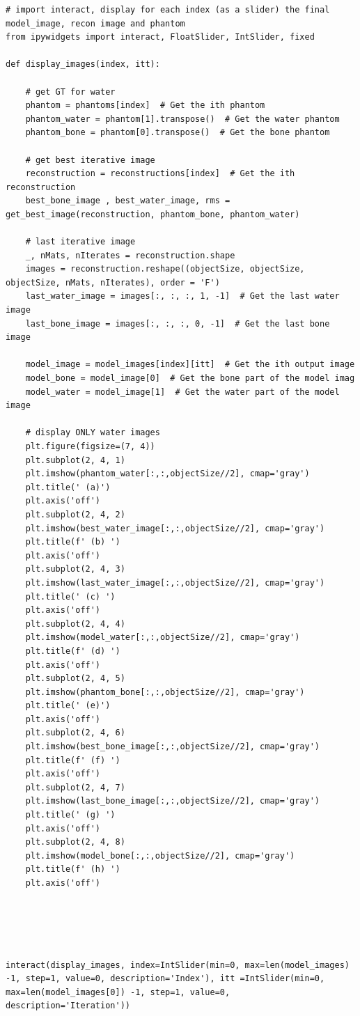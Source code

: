 \begin{verbatim}
# import interact, display for each index (as a slider) the final model_image, recon image and phantom
from ipywidgets import interact, FloatSlider, IntSlider, fixed

def display_images(index, itt):

    # get GT for water
    phantom = phantoms[index]  # Get the ith phantom
    phantom_water = phantom[1].transpose()  # Get the water phantom
    phantom_bone = phantom[0].transpose()  # Get the bone phantom

    # get best iterative image
    reconstruction = reconstructions[index]  # Get the ith reconstruction
    best_bone_image , best_water_image, rms = get_best_image(reconstruction, phantom_bone, phantom_water)

    # last iterative image
    _, nMats, nIterates = reconstruction.shape
    images = reconstruction.reshape((objectSize, objectSize, objectSize, nMats, nIterates), order = 'F')
    last_water_image = images[:, :, :, 1, -1]  # Get the last water image
    last_bone_image = images[:, :, :, 0, -1]  # Get the last bone image

    model_image = model_images[index][itt]  # Get the ith output image
    model_bone = model_image[0]  # Get the bone part of the model imag
    model_water = model_image[1]  # Get the water part of the model image

    # display ONLY water images
    plt.figure(figsize=(7, 4))
    plt.subplot(2, 4, 1)
    plt.imshow(phantom_water[:,:,objectSize//2], cmap='gray')
    plt.title(' (a)')
    plt.axis('off')
    plt.subplot(2, 4, 2)
    plt.imshow(best_water_image[:,:,objectSize//2], cmap='gray')
    plt.title(f' (b) ')
    plt.axis('off')
    plt.subplot(2, 4, 3)
    plt.imshow(last_water_image[:,:,objectSize//2], cmap='gray')
    plt.title(' (c) ')
    plt.axis('off')
    plt.subplot(2, 4, 4)
    plt.imshow(model_water[:,:,objectSize//2], cmap='gray')
    plt.title(f' (d) ')
    plt.axis('off')
    plt.subplot(2, 4, 5)
    plt.imshow(phantom_bone[:,:,objectSize//2], cmap='gray')
    plt.title(' (e)')
    plt.axis('off')
    plt.subplot(2, 4, 6)
    plt.imshow(best_bone_image[:,:,objectSize//2], cmap='gray')
    plt.title(f' (f) ')
    plt.axis('off')
    plt.subplot(2, 4, 7)
    plt.imshow(last_bone_image[:,:,objectSize//2], cmap='gray')
    plt.title(' (g) ')
    plt.axis('off')
    plt.subplot(2, 4, 8)
    plt.imshow(model_bone[:,:,objectSize//2], cmap='gray')
    plt.title(f' (h) ')
    plt.axis('off')





interact(display_images, index=IntSlider(min=0, max=len(model_images) -1, step=1, value=0, description='Index'), itt =IntSlider(min=0, max=len(model_images[0]) -1, step=1, value=0, description='Iteration'))
\end{verbatim}

